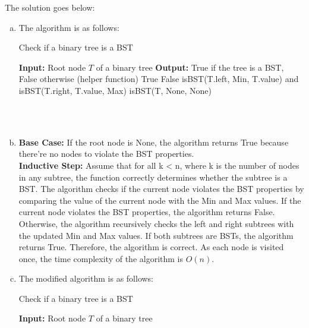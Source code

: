 \documentclass[10pt]{article}
\begin{document}
\begin{solution}
    The solution goes below:
    \begin{enumerate}[(a)]
        \item The algorithm is as follows:
        \begin{algorithm}
            \caption{Check if a binary tree is a BST} 
            \begin{algorithmic}[1]
            \Statex \textbf{Input:} Root node $T$ of a binary tree
            \Statex \textbf{Output:} True if the tree is a BST, False otherwise
             (helper function)
                    \State \Return True
                \EndIf
                    \State \Return False
                \EndIf
                \State \Return isBST(T.left, Min, T.value) and isBST(T.right, T.value, Max)
            \EndFunction
                \State \Return isBST(T, None, None)
            \EndFunction
            \end{algorithmic}
        \end{algorithm}
        \\ \\
        \item \textbf{Base Case:} If the root node is None, the algorithm returns True because there're no nodes to violate the BST properties. \\
        \textbf{Inductive Step:} Assume that for all k < n, where k is the number of nodes in any subtree, the function correctly determines whether the subtree is a BST.
        The algorithm checks if the current node violates the BST properties by comparing the value of the current node with the Min and Max values. If the current node violates the BST properties, the algorithm returns False. Otherwise, the algorithm recursively checks the left and right subtrees with the updated Min and Max values. If both subtrees are BSTs, the algorithm returns True. Therefore, the algorithm is correct.
        As each node is visited once, the time complexity of the algorithm is $O(n)$.
        \item The modified algorithm is as follows:
         \begin{algorithm}
            \caption{Check if a binary tree is a BST} 
            \begin{algorithmic}[1]
            \Statex \textbf{Input:} Root node $T$ of a binary tree

\end{algorithmic}
\end{algorithm}
\end{enumerate}
\end{solution}
\end{document}
